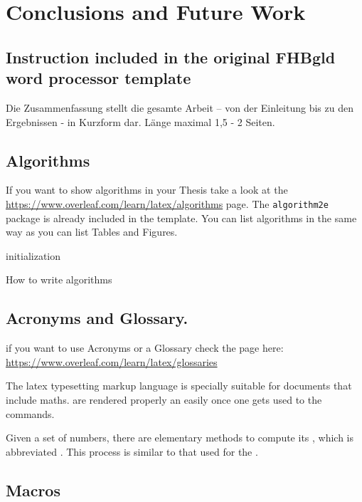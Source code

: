 \chapter{Conclusions and Future Work}

\section{Instruction included in the original FHBgld word processor template}
Die Zusammenfassung stellt die gesamte Arbeit – von der Einleitung bis zu den Ergebnissen - in Kurzform dar. Länge maximal 1,5 - 2 Seiten. 

\section{Algorithms}

If you want to show algorithms in your Thesis take a look at the \url{https://www.overleaf.com/learn/latex/algorithms} page. The \verb|algorithm2e| package is already included in the template. You can list algorithms in the same way as you can list Tables and Figures.

\begin{algorithm}[H]
	initialization\;
	\caption{How to write algorithms}
\end{algorithm}

\section{Acronyms and Glossary.}

if you want to use Acronyms or a Glossary check the page here: \url{https://www.overleaf.com/learn/latex/glossaries}

The \Gls{latex} typesetting markup language is specially suitable 
for documents that include \gls{maths}. are 
rendered properly an easily once one gets used to the commands.

Given a set of numbers, there are elementary methods to compute 
its , which is abbreviated . This 
process is similar to that used for the .

\section{Macros}

